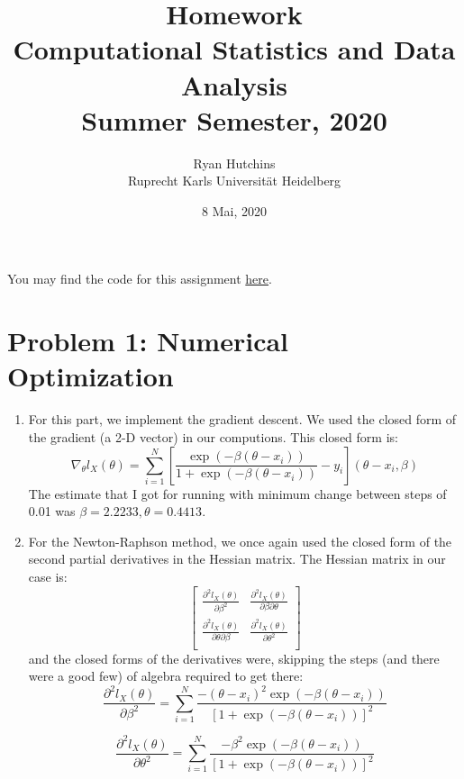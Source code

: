 \documentclass[a4paper,12pt]{article}
\title{
	Homework  \\
	\large Computational Statistics and Data Analysis \\
	\large Summer Semester, 2020
	}
\author{Ryan Hutchins \\ 
Ruprecht Karls Universit\"at Heidelberg}
\date{8 Mai, 2020}
\begin{document}
\maketitle

You may find the code for this assignment \href{https://github.com/GoliathMarks/Computational_Statistics/tree/master/CompStatsHomeworkFour}{here}.

\section{Problem 1: Numerical Optimization}

\begin{enumerate}
\item For this part, we implement the gradient descent. We used the closed form of the gradient (a 2-D vector) in our computions. This closed form is:
\begin{equation}
\nabla_{\theta}l_{X}(\theta) = \sum_{i=1}^{N}{\left[ \frac{ \exp(-\beta (\theta -x_{i})) } { 1 + \exp(-\beta (\theta -x_{i})) } - y_{i}  \right] \left( \theta - x_{i}, \beta  \right)  }
\end{equation}
The estimate that I got for running with minimum change between steps of 0.01 was $\beta = 2.2233, \theta =0.4413$.


\item For the Newton-Raphson method, we once again used the closed form of the second partial derivatives in the Hessian matrix. The Hessian matrix in our case is:
$$
\begin{bmatrix}
\frac{\partial^{2}l_{X}(\theta)}{\partial \beta^{2}} & \frac{\partial^{2}l_{X}(\theta)}{\partial \beta \partial \theta} \\
\frac{\partial^{2}l_{X}(\theta)}{\partial \theta \partial \beta} & \frac{\partial^{2}l_{X}(\theta)}{\partial \theta^{2}} \\
\end{bmatrix}
$$
and the closed forms of the derivatives were, skipping the steps (and there were a good few) of algebra required to get there:
\begin{equation}
\frac{\partial^{2}l_{X}(\theta)}{\partial \beta^{2}} = \sum_{i=1}^{N}{  \frac{ -(\theta - x_{i})^{2}  \exp(-\beta (\theta -x_{i}))   }{\left[  1 + \exp(-\beta (\theta -x_{i}))   \right]^{2} }  }
\end{equation}

\begin{equation}
\frac{\partial^{2}l_{X}(\theta)}{\partial \theta^{2}} = \sum_{i=1}^{N}{  \frac{  -\beta^{2} \exp(-\beta (\theta -x_{i})) }  {\left[  1 + \exp(-\beta (\theta -x_{i}))   \right]^{2} }  }
\end{equation}


\end{enumerate}
\end{document}
